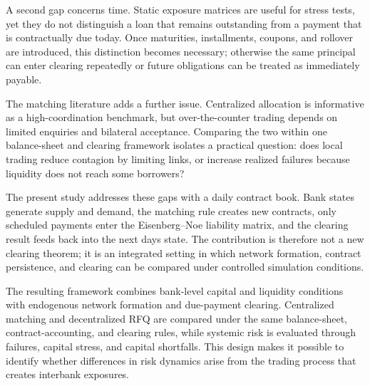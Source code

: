 A second gap concerns time. Static exposure matrices are useful for
stress tests, yet they do not distinguish a loan that remains
outstanding from a payment that is contractually due today. Once
maturities, installments, coupons, and rollover are introduced, this
distinction becomes necessary; otherwise the same principal can enter
clearing repeatedly or future obligations can be treated as immediately
payable.

The matching literature adds a further issue. Centralized allocation is
informative as a high-coordination benchmark, but over-the-counter
trading depends on limited enquiries and bilateral acceptance. Comparing
the two within one balance-sheet and clearing framework isolates a
practical question: does local trading reduce contagion by limiting
links, or increase realized failures because liquidity does not reach
some borrowers?

The present study addresses these gaps with a daily contract book. Bank
states generate supply and demand, the matching rule creates new
contracts, only scheduled payments enter the Eisenberg--Noe liability
matrix, and the clearing result feeds back into the next
day\textquotesingle s state. The contribution is therefore not a new
clearing theorem; it is an integrated setting in which network
formation, contract persistence, and clearing can be compared under
controlled simulation conditions.

The resulting framework combines bank-level capital and liquidity
conditions with endogenous network formation and due-payment clearing.
Centralized matching and decentralized RFQ are compared under the same
balance-sheet, contract-accounting, and clearing rules, while systemic
risk is evaluated through failures, capital stress, and capital
shortfalls. This design makes it possible to identify whether
differences in risk dynamics arise from the trading process that creates
interbank exposures.
